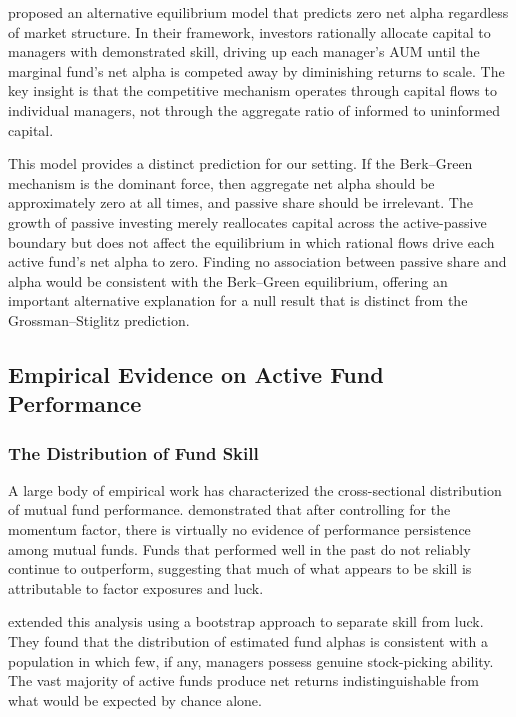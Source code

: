 \documentclass[11pt, a4paper]{article}
\begin{document}
\textcite{berk2004} proposed an alternative equilibrium model that predicts zero net alpha regardless of market structure. In their framework, investors rationally allocate capital to managers with demonstrated skill, driving up each manager's AUM until the marginal fund's net alpha is competed away by diminishing returns to scale. The key insight is that the competitive mechanism operates through capital flows to individual managers, not through the aggregate ratio of informed to uninformed capital.

This model provides a distinct prediction for our setting. If the Berk--Green mechanism is the dominant force, then aggregate net alpha should be approximately zero at all times, and passive share should be irrelevant. The growth of passive investing merely reallocates capital across the active-passive boundary but does not affect the equilibrium in which rational flows drive each active fund's net alpha to zero. Finding no association between passive share and alpha would be consistent with the Berk--Green equilibrium, offering an important alternative explanation for a null result that is distinct from the Grossman--Stiglitz prediction.

\subsection{Empirical Evidence on Active Fund Performance}

\subsubsection{The Distribution of Fund Skill}

A large body of empirical work has characterized the cross-sectional distribution of mutual fund performance. \textcite{carhart1997} demonstrated that after controlling for the momentum factor, there is virtually no evidence of performance persistence among mutual funds. Funds that performed well in the past do not reliably continue to outperform, suggesting that much of what appears to be skill is attributable to factor exposures and luck.

\textcite{fama2010} extended this analysis using a bootstrap approach to separate skill from luck. They found that the distribution of estimated fund alphas is consistent with a population in which few, if any, managers possess genuine stock-picking ability. The vast majority of active funds produce net returns indistinguishable from what would be expected by chance alone.
\end{document}
